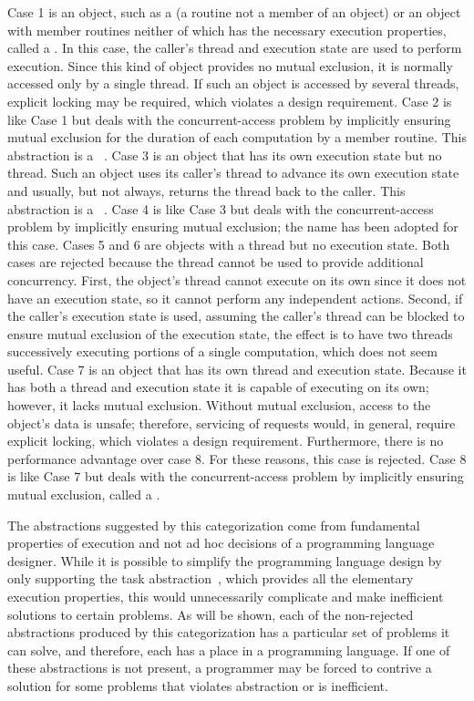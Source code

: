 \documentclass[openright,twoside]{report}
\begin{document}
\noindent
Case 1 is an object, such as a  (a routine not a member of an object) or an object with member routines neither of which has the necessary execution properties, called a .
In this case, the caller's thread and execution state are used to perform execution.
Since this kind of object provides no mutual exclusion, it is normally accessed only by a single thread.
If such an object is accessed by several threads, explicit locking may be required, which violates a design requirement.
Case 2 is like Case 1 but deals with the concurrent-access problem by implicitly ensuring mutual exclusion for the duration of each computation by a member routine.
This abstraction is a ~\cite{Hoare74}.
Case 3 is an object that has its own execution state but no thread.
Such an object uses its caller's thread to advance its own execution state and usually, but not always, returns the thread back to the caller.
This abstraction is a ~\cite{Marlin80}.
Case 4 is like Case 3 but deals with the concurrent-access problem by implicitly ensuring mutual exclusion;
the name  has been adopted for this case.
Cases 5 and 6 are objects with a thread but no execution state.
Both cases are rejected because the thread cannot be used to provide additional concurrency.
First, the object's thread cannot execute on its own since it does not have an execution state, so it cannot perform any independent actions.
Second, if the caller's execution state is used, assuming the caller's thread can be blocked to ensure mutual exclusion of the execution state, the effect is to have two threads successively executing portions of a single computation, which does not seem useful.
Case 7 is an object that has its own thread and execution state.
Because it has both a thread and execution state it is capable of executing on its own;
however, it lacks mutual exclusion.
Without mutual exclusion, access to the object's data is unsafe;
therefore, servicing of requests would, in general, require explicit locking, which violates a design requirement.
Furthermore, there is no performance advantage over case 8.
For these reasons, this case is rejected.
Case 8 is like Case 7 but deals with the concurrent-access problem by implicitly ensuring mutual exclusion, called a .

The abstractions suggested by this categorization come from fundamental properties of execution and not ad hoc decisions of a programming language designer.
While it is possible to simplify the programming language design by only supporting the task abstraction~\cite{Hermes90}, which provides all the elementary execution properties, this would unnecessarily complicate and make inefficient solutions to certain problems.
As will be shown, each of the non-rejected abstractions produced by this categorization has a particular set of problems it can solve, and therefore, each has a place in a programming language.
If one of these abstractions is not present, a programmer may be forced to contrive a solution for some problems that violates abstraction or is inefficient.
\end{document}
